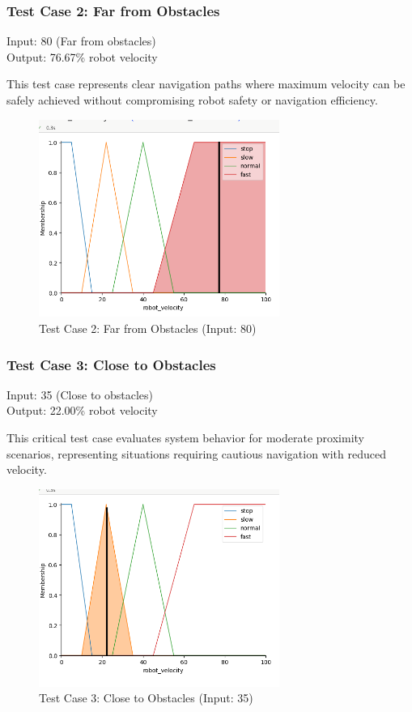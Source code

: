 \documentclass[11pt,a4paper]{article}
\begin{document}
\subsubsection{Test Case 2: Far from Obstacles}
Input: 80 (Far from obstacles) \\
Output: 76.67\% robot velocity

This test case represents clear navigation paths where maximum velocity can be safely achieved without compromising robot safety or navigation efficiency.

\begin{figure}[H]
\centering
\includegraphics[width=0.7\textwidth]{plots/test2.png}
\caption{Test Case 2: Far from Obstacles (Input: 80)}
\end{figure}

\subsubsection{Test Case 3: Close to Obstacles}
Input: 35 (Close to obstacles) \\
Output: 22.00\% robot velocity

This critical test case evaluates system behavior for moderate proximity scenarios, representing situations requiring cautious navigation with reduced velocity.

\begin{figure}[H]
\centering
\includegraphics[width=0.7\textwidth]{plots/test3.png}
\caption{Test Case 3: Close to Obstacles (Input: 35)}
\end{figure}
\end{document}
